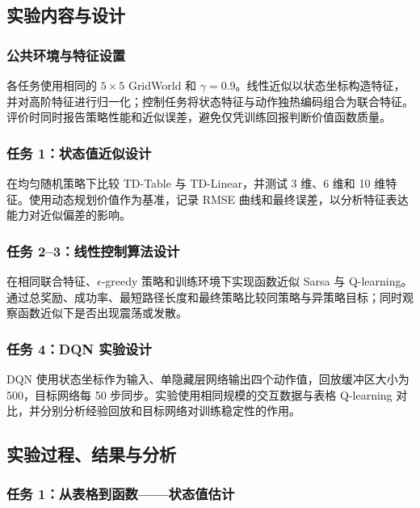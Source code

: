 \documentclass[11pt,a4paper,UTF8]{ctexart}
\numberwithin{figure}{section}
\numberwithin{table}{section}
\begin{document}
\subsection{实验内容与设计}

\subsubsection{公共环境与特征设置}

各任务使用相同的 $5\times5$ GridWorld 和 $\gamma=0.9$。线性近似以状态坐标构造特征，并对高阶特征进行归一化；控制任务将状态特征与动作独热编码组合为联合特征。评价时同时报告策略性能和近似误差，避免仅凭训练回报判断价值函数质量。

\subsubsection{任务 1：状态值近似设计}

在均匀随机策略下比较 TD-Table 与 TD-Linear，并测试 3 维、6 维和 10 维特征。使用动态规划价值作为基准，记录 RMSE 曲线和最终误差，以分析特征表达能力对近似偏差的影响。

\subsubsection{任务 2--3：线性控制算法设计}

在相同联合特征、$\epsilon$-greedy 策略和训练环境下实现函数近似 Sarsa 与 Q-learning。通过总奖励、成功率、最短路径长度和最终策略比较同策略与异策略目标；同时观察函数近似下是否出现震荡或发散。

\subsubsection{任务 4：DQN 实验设计}

DQN 使用状态坐标作为输入、单隐藏层网络输出四个动作值，回放缓冲区大小为 500，目标网络每 50 步同步。实验使用相同规模的交互数据与表格 Q-learning 对比，并分别分析经验回放和目标网络对训练稳定性的作用。




\subsection{实验过程、结果与分析}

\subsubsection{任务 1：从表格到函数——状态值估计}
\end{document}
